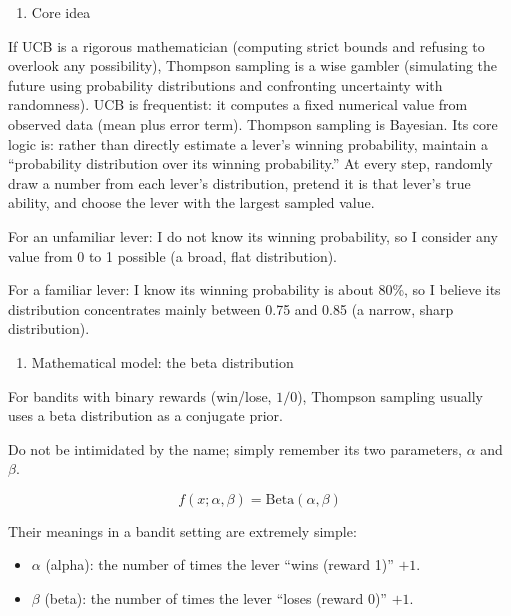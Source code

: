 \begin{enumerate}
\def\labelenumi{\arabic{enumi}.}
\tightlist
\item
  Core idea
\end{enumerate}

If UCB is a rigorous mathematician (computing strict bounds and refusing to overlook any possibility), Thompson sampling is a wise gambler (simulating the future using probability distributions and confronting uncertainty with randomness). UCB is frequentist: it computes a fixed numerical value from observed data (mean plus error term). Thompson sampling is Bayesian. Its core logic is: rather than directly estimate a lever's winning probability, maintain a ``probability distribution over its winning probability.'' At every step, randomly draw a number from each lever's distribution, pretend it is that lever's true ability, and choose the lever with the largest sampled value.

For an unfamiliar lever: I do not know its winning probability, so I consider any value from 0 to 1 possible (a broad, flat distribution).

For a familiar lever: I know its winning probability is about 80\%, so I believe its distribution concentrates mainly between 0.75 and 0.85 (a narrow, sharp distribution).

\begin{enumerate}
\def\labelenumi{\arabic{enumi}.}
\setcounter{enumi}{1}
\tightlist
\item
  Mathematical model: the beta distribution
\end{enumerate}

For bandits with binary rewards (win/lose, \(1/0\)), Thompson sampling usually uses a beta distribution as a conjugate prior.

Do not be intimidated by the name; simply remember its two parameters, \(\alpha\) and \(\beta\).

\[
f(x;\alpha,\beta)=\mathrm{Beta}(\alpha,\beta)
\]

Their meanings in a bandit setting are extremely simple:

\begin{itemize}
\tightlist
\item
  \(\alpha\) (alpha): the number of times the lever ``wins (reward 1)'' \(+1\).
\item
  \(\beta\) (beta): the number of times the lever ``loses (reward 0)'' \(+1\).
\end{itemize}

